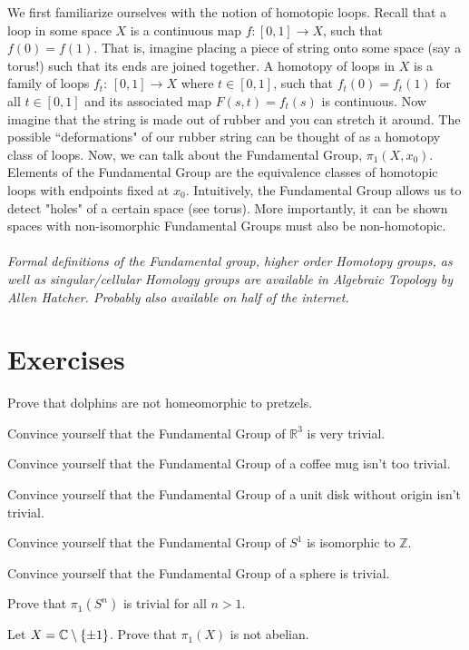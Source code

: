 \documentclass{article}
\begin{document}
We first familiarize ourselves with the notion of homotopic loops. Recall that a loop in some space $X$ is a continuous 
map $f: [0,1] \to X$, such that $f(0) = f(1)$. That is, imagine placing a piece of string onto some space (say a torus!) such that 
its ends are joined together. A homotopy of loops in $X$ is a family of loops $f_t$: $[0,1] \to X$ where $t \in [0,1]$, such that 
$f_t (0) = f_t(1)$ for all $t \in [0,1]$ and its associated map $F(s,t) = f_t (s)$ is continuous. Now imagine that the string is made out of rubber and you can stretch it around. The possible ``deformations" of our rubber string can be thought of as 
a homotopy class of loops. Now, we can talk about the Fundamental Group, $\pi_1 (X, x_0)$. Elements of the Fundamental Group are the
equivalence classes of homotopic loops with endpoints fixed at $x_0$. Intuitively, the Fundamental Group allows us to detect "holes" of a certain space (see torus). More importantly, it can be shown spaces with non-isomorphic Fundamental Groups must also be non-homotopic. \\\\
\emph{Formal definitions of the Fundamental group, higher order Homotopy groups, as well as singular/cellular Homology groups are available in
Algebraic Topology by Allen Hatcher. Probably also available on half of the internet.}
\\
\section{Exercises}
\begin{exercise}[Unsolved]
    Prove that dolphins are not homeomorphic to pretzels.
\end{exercise}
\begin{exercise}
    Convince yourself that the Fundamental Group of $\mathbb{R}^3$ is very trivial.
\end{exercise}
\begin{exercise}
    Convince yourself that the Fundamental Group of a coffee mug isn't too trivial. 
\end{exercise}
\begin{exercise} 
    Convince yourself that the Fundamental Group of a unit disk without origin isn't trivial.
\end{exercise}
\begin{exercise}
    Convince yourself that the Fundamental Group of $S^{1}$ is isomorphic to $\mathbb{Z}$.
\end{exercise}
\begin{exercise} 
    Convince yourself that the Fundamental Group of a sphere is trivial.
\end{exercise}
\begin{exercise} 
    Prove that $\pi_1 (S^n)$ is trivial for all $n > 1$.
\end{exercise}
\begin{exercise}
Let $X=\mathbb{C}\setminus \{\pm 1\}$. Prove that $\pi_1(X)$ is not abelian.
\end{exercise}
\end{document}
